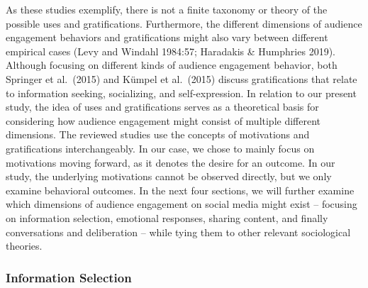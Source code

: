 \documentclass[
]{article}
\begin{document}
As these studies exemplify, there is not a finite taxonomy or theory of
the possible uses and gratifications. Furthermore, the different
dimensions of audience engagement behaviors and gratifications might
also vary between different empirical cases (Levy and Windahl 1984:57;
Haradakis \& Humphries 2019). Although focusing on different kinds of
audience engagement behavior, both Springer et al.~(2015) and Kümpel et
al.~(2015) discuss gratifications that relate to information seeking,
socializing, and self-expression. In relation to our present study, the
idea of uses and gratifications serves as a theoretical basis for
considering how audience engagement might consist of multiple different
dimensions. The reviewed studies use the concepts of motivations and
gratifications interchangeably. In our case, we chose to mainly focus on
motivations moving forward, as it denotes the desire for an outcome. In
our study, the underlying motivations cannot be observed directly, but
we only examine behavioral outcomes. In the next four sections, we will
further examine which dimensions of audience engagement on social media
might exist -- focusing on information selection, emotional responses,
sharing content, and finally conversations and deliberation -- while
tying them to other relevant sociological theories.

\hypertarget{information-selection}{%
\subsubsection{Information Selection}\label{information-selection}}
\end{document}
